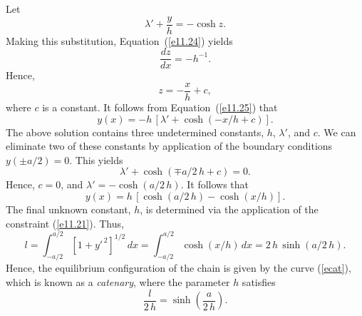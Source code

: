 Let 
\begin{equation}\label{e11.25}
\lambda' + \frac{y}{h} = -\cosh z.
\end{equation}
Making this substitution, Equation~(\ref{e11.24}) yields
\begin{equation}
\frac{dz}{dx} = -h^{-1}.
\end{equation}
Hence, 
\begin{equation}
z =-\frac{x}{h} + c,
\end{equation}
where  $c$ is a constant. It follows from Equation~(\ref{e11.25}) that 
\begin{equation}
y(x) =-h\,[\lambda' + \cosh(-x/h + c)].
\end{equation}
The above solution contains three undetermined constants, $h$, $\lambda'$, and $c$. We can
eliminate two of these constants by application of the boundary
conditions $y(\pm a/2)= 0$. This yields
\begin{equation}
\lambda' + \cosh(\mp a/2\,h + c) = 0.
\end{equation}
Hence, $c=0$, and $\lambda' = - \cosh (a/2\,h)$. It follows that
\begin{equation}\label{ecat}
y(x) = h\,[\cosh(a/2\,h) - \cosh(x/h)].
\end{equation}
The final unknown constant, $h$, is determined via the application of
the constraint (\ref{e11.21}). Thus,
\begin{equation}
l= \int_{-a/2}^{a/2}[1+y'^{\,2}]^{1/2}\,dx = \int_{-a/2}^{a/2} \cosh(x/h) \,dx = 2\,h\,\sinh(a/2\,h).
\end{equation}
Hence, the equilibrium configuration of the chain is given by the curve
(\ref{ecat}), which is known as a {\em catenary}, where the parameter $h$ satisfies
\begin{equation}
\frac{l}{2\,h} = \sinh\left(\frac{a}{2\,h}\right).
\end{equation}


